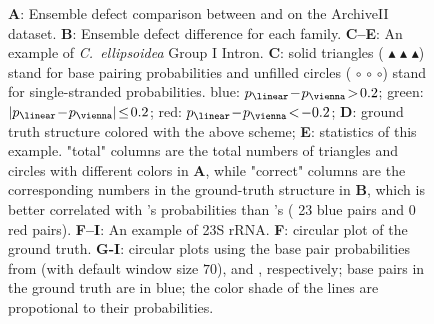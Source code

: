 \begin{figure}
\begin{tabular}{cccc}
\end{tabular}
\caption{
{\bf A}: Ensemble defect comparison between \viennarnafold and \linearpartition on the ArchiveII dataset.
{\bf B}: Ensemble defect difference for each family.
{\bf C--E}: An example of {\it C.~ellipsoidea} Group I Intron. 
{\bf C}: solid triangles ({\small {\color{blue} $\blacktriangle$} {\color{darkgreen}$\blacktriangle$}  {\color{red}$\blacktriangle$}}) stand for base pairing probabilities and
unfilled circles ({\small {\color{blue} $\circ$} {\color{darkgreen}$\circ$}  {\color{red}$\circ$}})  stand for single-stranded probabilities.
{\color{blue} blue: $p_\linear \!-\! p_\vienna \!>\! 0.2$};
{\color{darkgreen} green: $|p_\linear \!-\! p_\vienna| \!\leq \!0.2$};
{\color{red} red: $p_\linear \!-\! p_\vienna \!<\! -0.2$};
	{\bf D}: ground truth structure colored with the above scheme; %
	{\bf E}: statistics of this example. 
	"total" columns are the total numbers of triangles and circles with different colors in {\bf A},
	while "correct" columns are the corresponding numbers %
        in the ground-truth structure  in {\bf B},
        which is better correlated with \linearpartition's probabilities than \viennarnafold's ({\color{blue} 23 blue pairs} and {\color{red} 0 red pairs}). %
{\bf F--I}: An example of \ecoli 23S rRNA. 
	{\bf F}: circular plot of the ground truth.
{\bf G-I}: circular plots using the base pair probabilities from \viennarnaplfold (with default window size $70$), \rnafold and \linearpartition, respectively; 
base pairs in the ground truth are in blue;
the color shade of the lines are propotional to their probabilities.
	\label{example}\\[-.7cm]
}
\end{figure}
